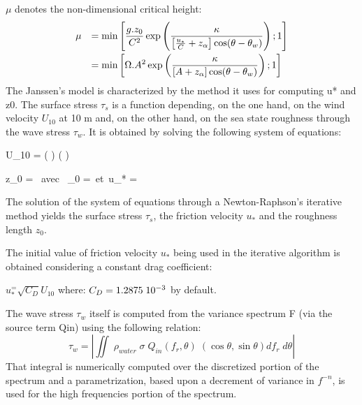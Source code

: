  $\mu$ denotes the non-dimensional critical height:
\begin{equation} 
\label{GrindEQ__4_30_}
\barr{ll}
\mu &\dsp =\min \left[\frac{g.z_{0} }{C^{2} } \exp \left(\frac{\kappa }{
    \left[\frac{u_{*} }{C} +z_{\alpha } \right]\cos (\theta -\theta _{w} )}
  \right);1\right] \\[12pt]
&\dsp =\min \left[\Omega .A^{2} \exp \left(\frac{\kappa }{\left[A+z_{\alpha }
      \right]\cos (\theta -\theta _{w} )} \right);1\right]
\earr
\end{equation}
The Janssen's model \cite {Janssen1989} \cite{Janssen1991} is characterized by
the method it uses for computing u* and z0. The surface stress $\tau_s$ is a
function depending, on the one hand, on the wind velocity $U_{10}$ at 10 m and,
on the other hand, on the sea state roughness through the wave stress $\tau_w$.
It is obtained by solving the following system of equations:

\bequ
\label{eq:defu10}
U_{10} = \ln \left(
\right)\approx {} \ln \left( \right)
\eequ

\bequ
\label{eq:defz0}
z_0 = \mbox{ avec }
_0 =\alpha {}\mbox{  et  }u_*
=
\eequ

The solution of the system of equations through a Newton-Raphson's iterative
method yields the surface stress $\tau_s$, the friction velocity $u_*$ and the
roughness length $z_0$.

The initial value of friction velocity $u_*$ being used in the iterative
algorithm is obtained considering a constant drag coefficient:

$u_*^ =\sqrt{C_{D} } U_{10} $ where: $C_D = 1.2875\hspace{.1cm} 10^{-3}$ by
default.

The wave stress $\tau_w$ itself is computed from the variance spectrum F
(via the source term Qin) using the following relation:
\begin{equation} \label{GrindEQ__4_32_}
  \tau _{w} =\left|\iint \;  \rho _{water} \; \sigma \; Q_{in} (f_{r} ,\theta )\;
  \left(\cos \theta ,\sin \theta \right)df_{r} \; d\theta \right|
\end{equation}
That integral is numerically computed over the discretized portion of the
spectrum and a parametrization, based upon a decrement of variance in $f^{-n}$,
is used for the high frequencies portion of the spectrum.

